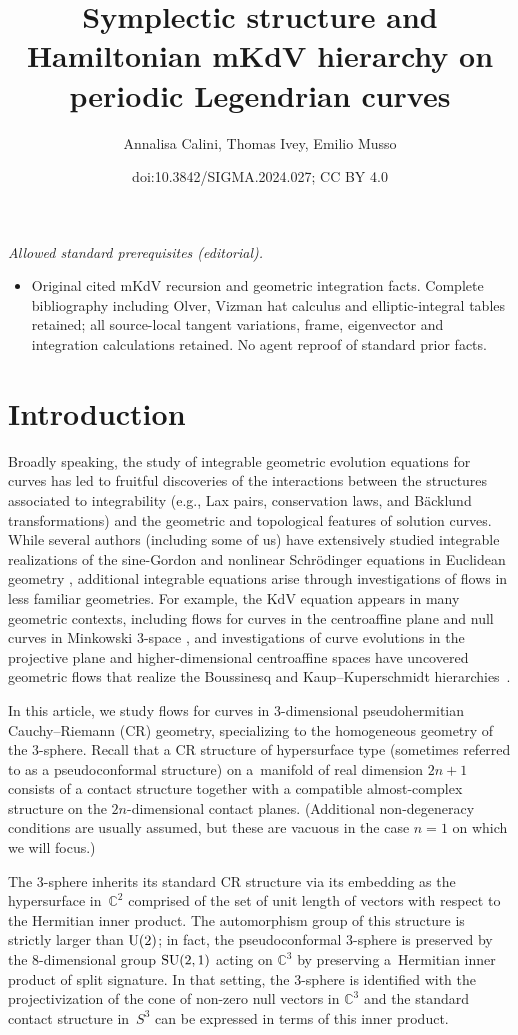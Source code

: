 \documentclass[10pt,a4paper]{amsart}
\title{Symplectic structure and Hamiltonian mKdV hierarchy on periodic Legendrian curves}
\author{Annalisa Calini, Thomas Ivey, Emilio Musso}
\date{doi:10.3842/SIGMA.2024.027; CC BY 4.0}
\def\C{\mathbb C}
\numberwithin{equation}{section}
\begin{document}
\maketitle
\noindent\textit{Allowed standard prerequisites (editorial).}\begin{itemize}
\item Original cited mKdV recursion and geometric integration facts. Complete bibliography including Olver, Vizman hat calculus and elliptic-integral tables retained; all source-local tangent variations, frame, eigenvector and integration calculations retained. No agent reproof of standard prior facts.
\end{itemize}\medskip
\section{Introduction}
Broadly speaking, the study of integrable geometric evolution equations for curves has led to fruitful discoveries of the interactions between the structures associated to integrability (e.g., Lax pairs, conservation laws, and B\"acklund transformations) and the geometric and topological features of solution curves. While several authors (including some of us) have extensively studied integrable realizations of the sine-Gordon and nonlinear Schr\"odinger equations in Euclidean geometry \cite{CI99,CI01,LP91}, additional integrable equations arise through investigations of flows in less familiar geometries. For example, the KdV equation appears in many geometric contexts, including flows for curves in the centroaffine plane \cite{CIM1,Pi} and null curves in Minkowski 3-space \cite{MN}, and investigations of curve evolutions in the projective plane and higher-dimensional centroaffine spaces have uncovered geometric flows that realize the Boussinesq and Kaup--Kuperschmidt hierarchies~\cite{CIM2,M1}.

In this article, we study flows for curves in 3-dimensional pseudohermitian Cauchy--Riemann (CR) geometry, specializing to the homogeneous geometry of the 3-sphere. Recall that a CR structure of hypersurface type (sometimes referred to as a pseudoconformal structure) on a~mani\-fold of real dimension $2n+1$ consists of a contact structure together with a compatible almost-complex structure on the $2n$-dimensional contact planes.
(Additional non-degeneracy conditions are usually assumed, but these are vacuous
in the case $n=1$ on which we will focus.)

The 3-sphere inherits its standard CR structure via its embedding as the hypersurface in~$\C^2$ comprised of the set of unit length
of vectors with respect to the Hermitian inner product. The automorphism group of this structure is strictly larger than ${\rm U}(2)$; in fact, the pseudoconformal 3-sphere is preserved by the 8-dimensional group ${\rm SU}(2,1)$ acting on $\C^3$ by preserving a~Hermitian inner product of split signature. In that setting, the 3-sphere is identified with the projectivization of the cone of non-zero null vectors in $\C^3$ and the standard contact structure in~$S^3$ can be expressed in terms of this inner product.
\end{document}
